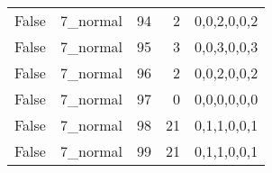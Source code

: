 \begin{tabular}{llrrl}
 False           & 7\_normal            &            94 &                     2 & 0,0,2,0,0,2   \\
 False           & 7\_normal            &            95 &                     3 & 0,0,3,0,0,3   \\
 False           & 7\_normal            &            96 &                     2 & 0,0,2,0,0,2   \\
 False           & 7\_normal            &            97 &                     0 & 0,0,0,0,0,0   \\
 False           & 7\_normal            &            98 &                    21 & 0,1,1,0,0,1   \\
 False           & 7\_normal            &            99 &                    21 & 0,1,1,0,0,1   \\
\hline
\end{tabular}